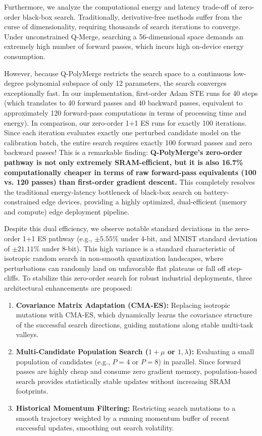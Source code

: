 Furthermore, we analyze the computational energy and latency trade-off of zero-order black-box search. Traditionally, derivative-free methods suffer from the curse of dimensionality, requiring thousands of search iterations to converge. Under unconstrained Q-Merge, searching a 56-dimensional space demands an extremely high number of forward passes, which incurs high on-device energy consumption. 

However, because Q-PolyMerge restricts the search space to a continuous low-degree polynomial subspace of only 12 parameters, the search converges exceptionally fast. In our implementation, first-order Adam STE runs for 40 steps (which translates to 40 forward passes and 40 backward passes, equivalent to approximately 120 forward-pass computations in terms of processing time and energy). In comparison, our zero-order 1+1 ES runs for exactly 100 iterations. Since each iteration evaluates exactly one perturbed candidate model on the calibration batch, the entire search requires exactly 100 forward passes and zero backward passes! This is a remarkable finding: \textbf{Q-PolyMerge's zero-order pathway is not only extremely SRAM-efficient, but it is also 16.7\% computationally cheaper in terms of raw forward-pass equivalents (100 vs. 120 passes) than first-order gradient descent.} This completely resolves the traditional energy-latency bottleneck of black-box search on battery-constrained edge devices, providing a highly optimized, dual-efficient (memory and compute) edge deployment pipeline.

Despite this dual efficiency, we observe notable standard deviations in the zero-order 1+1 ES pathway (e.g., $\pm 5.55\%$ under 4-bit, and MNIST standard deviation of $\pm 21.11\%$ under 8-bit). This high variance is a standard characteristic of isotropic random search in non-smooth quantization landscapes, where perturbations can randomly land on unfavorable flat plateaus or fall off step-cliffs. To stabilize this zero-order search for robust industrial deployments, three architectural enhancements are proposed:
\begin{enumerate}
    \item \textbf{Covariance Matrix Adaptation (CMA-ES):} Replacing isotropic mutations with CMA-ES, which dynamically learns the covariance structure of the successful search directions, guiding mutations along stable multi-task valleys.
    \item \textbf{Multi-Candidate Population Search ($1+\mu$ or $1,\lambda$):} Evaluating a small population of candidates (e.g., $P=4$ or $P=8$) in parallel. Since forward passes are highly cheap and consume zero gradient memory, population-based search provides statistically stable updates without increasing SRAM footprints.
    \item \textbf{Historical Momentum Filtering:} Restricting search mutations to a smooth trajectory weighted by a running momentum buffer of recent successful updates, smoothing out search volatility.
\end{enumerate}

